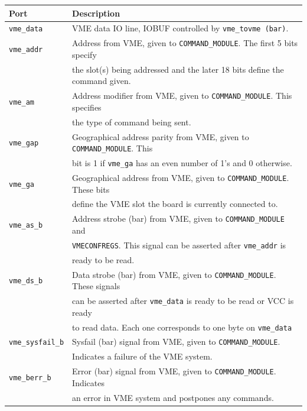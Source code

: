 \documentclass[10pt,a4paper]{article}
\begin{document}
\begin{table}[H]
\centering
\begin{tabular}{|l|l|} \hline
Port& Description\\ \hline
\texttt{vme\_data}& VME data IO line, IOBUF controlled by \texttt{vme\_tovme (bar)}.\\ \hline
\texttt{vme\_addr}& Address from VME, given to \texttt{COMMAND\_MODULE}. The first 5 bits specify \\
                  & the slot(s) being addressed and the later 18 bits define the command given.\\ \hline
\texttt{vme\_am}& Address modifier from VME, given to \texttt{COMMAND\_MODULE}. This specifies\\ 
                & the type of command being sent. \\ \hline
\texttt{vme\_gap}& Geographical address parity from VME, given to \texttt{COMMAND\_MODULE}. This \\
                & bit is 1 if \texttt{vme\_ga} has an even number of 1's and 0 otherwise. \\ \hline
\texttt{vme\_ga}& Geographical address from VME, given to \texttt{COMMAND\_MODULE}. These bits \\
                 & define the VME slot the board is currently connected to.\\ \hline
\texttt{vme\_as\_b}& Address strobe (bar) from VME, given to \texttt{COMMAND\_MODULE} and  \\
                   & \texttt{VMECONFREGS}. This signal can be asserted after \texttt{vme\_addr} is \\
									 & ready to be read.\\ \hline
\texttt{vme\_ds\_b}& Data strobe (bar) from VME, given to \texttt{COMMAND\_MODULE}. These signals \\
                   & can be asserted after \texttt{vme\_data} is ready to be read or VCC is ready \\
									 & to read data. Each one corresponds to one byte on \texttt{vme\_data}\\ \hline
\texttt{vme\_sysfail\_b}& Sysfail (bar) signal from VME, given to \texttt{COMMAND\_MODULE}. \\
                        & Indicates a failure of the VME system.\\ \hline
\texttt{vme\_berr\_b}& Error (bar) signal from VME, given to \texttt{COMMAND\_MODULE}. Indicates \\
                     & an error in VME system and postpones any commands.\\ \hline

\end{tabular}
\end{table}
\end{document}
